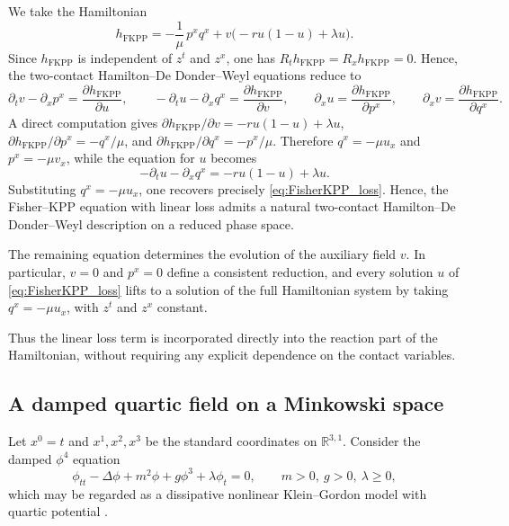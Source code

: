 \documentclass[11pt,a4paper]{article}
\theoremstyle{plain} \newtheorem{theorem}{Theorem}[section] \newtheorem{proposition}[theorem]{Proposition} \newtheorem{corollary}[theorem]{Corollary} \newtheorem{lemma}[theorem]{Lemma} \theoremstyle{definition} \newtheorem{definition}[theorem]{Definition} \theoremstyle{remark} \newtheorem{remark}[theorem]{Remark} \newtheorem{example}[theorem]{Example} %
\begin{document}
We take the Hamiltonian
\[
h_{\mathrm{FKPP}}=-\frac1{\mu}\,p^xq^x+v\bigl(-ru(1-u)+\lambda u\bigr).
\]
Since \(h_{\mathrm{FKPP}}\) is independent of \(z^t\) and \(z^x\), one has \( {R_t}h_{\mathrm{FKPP}}= {R_x}h_{\mathrm{FKPP}}=0\). Hence, the two-contact Hamilton--De Donder--Weyl equations reduce to
\[
\partial_t v-\partial_x p^x=\frac{\partial h_{\mathrm{FKPP}}}{\partial u},\qquad
-\partial_t u-\partial_x q^x=\frac{\partial h_{\mathrm{FKPP}}}{\partial v},\qquad
\partial_x u=\frac{\partial h_{\mathrm{FKPP}}}{\partial p^x},\qquad
\partial_x v=\frac{\partial h_{\mathrm{FKPP}}}{\partial q^x}.
\]
A direct computation gives \(\partial h_{\mathrm{FKPP}}/\partial v=-ru(1-u)+\lambda u\), \(\partial h_{\mathrm{FKPP}}/\partial p^x=-q^x/\mu\), and \(\partial h_{\mathrm{FKPP}}/\partial q^x=-p^x/\mu\). Therefore \(q^x=-\mu u_x\) and \(p^x=-\mu v_x\), while the equation for \(u\) becomes
\[
-\partial_t u-\partial_x q^x=-ru(1-u)+\lambda u.
\]
Substituting \(q^x=-\mu u_x\), one recovers precisely \eqref{eq:FisherKPP_loss}. Hence, the Fisher--KPP equation with linear loss admits a natural two-contact Hamilton--De Donder--Weyl description on a reduced phase space.

The remaining equation determines the evolution of the auxiliary field \(v\). In particular, \(v=0\) and \(p^x=0\) define a consistent reduction, and every solution \(u\) of \eqref{eq:FisherKPP_loss} lifts to a solution of the full Hamiltonian system by taking \(q^x=-\mu u_x\), with \(z^t\) and \(z^x\) constant.

Thus the linear loss term is incorporated directly into the reaction part of the Hamiltonian, without requiring any explicit dependence on the contact variables.

\subsection{A damped quartic field on a Minkowski space}
\label{subsec:phi4_31}

Let \(x^0=t\) and \(x^1,x^2,x^3\) be the standard coordinates on \(\mathbb R^{3,1}\). Consider the damped \(\phi^4\) equation
\begin{equation}\label{eq:damped_phi4}
\phi_{tt}-\Delta\phi+m^2\phi+g\phi^3+\lambda \phi_t=0,
\qquad m>0,\ g>0,\ \lambda\ge0,
\end{equation}
which may be regarded as a dissipative nonlinear Klein--Gordon model with quartic potential \cite{Ryd_96,WangCheng2005,QuinteroSanchezMertens2001,LizunovaVanWezel2021}.
\end{document}
